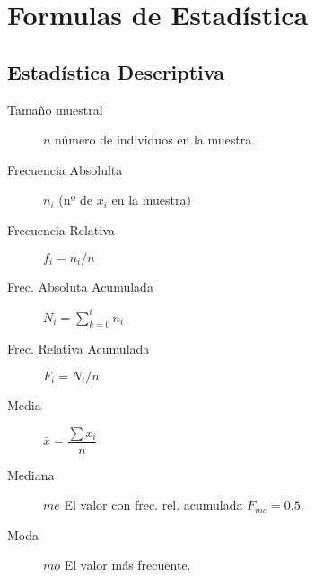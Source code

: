 
\sloppy

\section*{Formulas de Estadística}

\footnotesize
{}

\begin{multicols*}{2}

\subsection*{Estadística Descriptiva}

\begin{tcolorbox}[hbox, title=Frecuencias]
\begin{minipage}{0.4\textwidth}
\begin{description}
\item [Tamaño muestral] $n$ número de individuos en la muestra.
\end{description}
\begin{description}
\item [Frecuencia Absolulta] $n_i$ (nº de $x_i$ en la muestra)
\item [Frecuencia Relativa] $f_i=n_i/n$
\item [Frec. Absoluta Acumulada] $N_i=\sum_{k=0}^in_i$
\item [Frec. Relativa Acumulada] $F_i=N_i/n$
\end{description}
\end{minipage}
\end{tcolorbox}

\begin{tcolorbox}[hbox, title=Estadísticos de tendencia central]
\begin{minipage}{0.4\textwidth}
\begin{description}
\item [Media] $\bar{x}=\dfrac{\sum x_i}{n}$
\item [Mediana] $me$ El valor con frec. rel. acumulada $F_{me}=0.5$.
\item [Moda] $mo$ El valor más frecuente.
\end{description}
\end{minipage}
\end{tcolorbox}


\end{multicols*}
